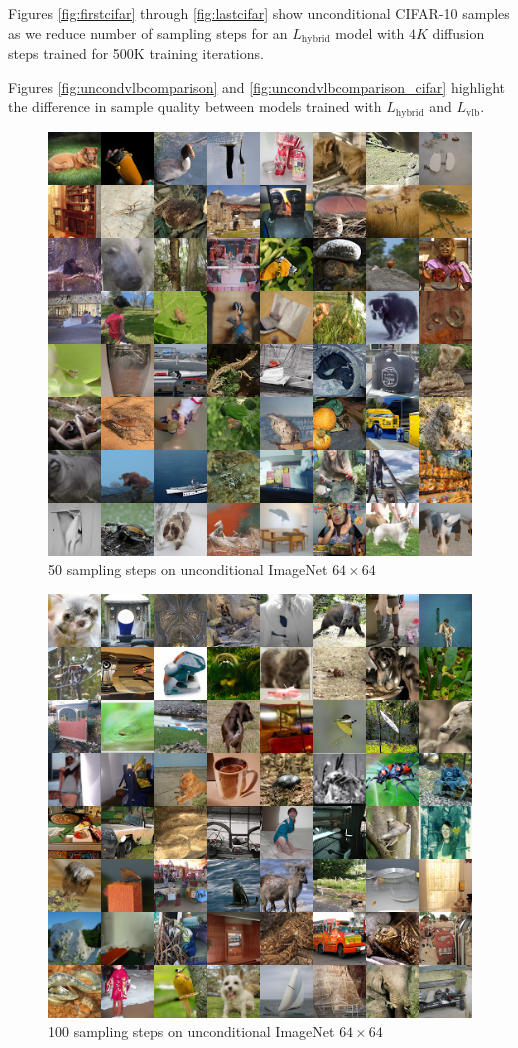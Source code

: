 \documentclass{article}
\begin{document}
Figures \ref{fig:firstcifar} through \ref{fig:lastcifar} show unconditional CIFAR-10 samples as we reduce number of sampling steps for an $L_{\text{hybrid}}$ model with $4K$ diffusion steps trained for 500K training iterations.

Figures \ref{fig:uncondvlbcomparison} and \ref{fig:uncondvlbcomparison_cifar} highlight the difference in sample quality between models trained with $L_{\text{hybrid}}$ and $L_{\text{vlb}}$.

\clearpage

\begin{figure}[h!]
    \centerline{\includegraphics[width=0.78\columnwidth]{samples_hybrid_50steps_1.5M_grid.png}}
    \caption{\label{fig:firstimagenet} 50 sampling steps on unconditional ImageNet $64 \times 64$}
\end{figure}
\begin{figure}[h!]
    \centerline{\includegraphics[width=0.78\columnwidth]{samples_hybrid_100steps_1.5M_grid.png}}
    \caption{100 sampling steps on unconditional ImageNet $64 \times 64$}
\end{figure}
\end{document}
